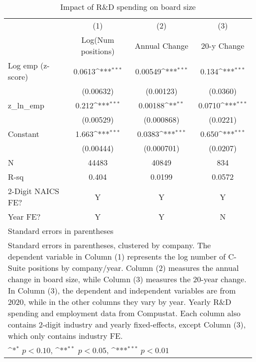 \begin{table}[htbp]\centering
\def\sym#1{\ifmmode^{#1}\else\(^{#1}\)\fi}
\caption{Impact of R\&D spending on board size\label{tab1}}
\begin{tabular}{l*{3}{c}}
\toprule
                &\multicolumn{1}{c}{(1)}&\multicolumn{1}{c}{(2)}&\multicolumn{1}{c}{(3)}\\
                &\multicolumn{1}{c}{Log(Num positions)}&\multicolumn{1}{c}{Annual Change}&\multicolumn{1}{c}{20-y Change}\\
\midrule
Log emp (z-score)&   0.0613\sym{***}&  0.00549\sym{***}&    0.134\sym{***}\\
                &(0.00632)         &(0.00123)         & (0.0360)         \\
z\_ln\_emp        &    0.212\sym{***}&  0.00188\sym{**} &   0.0710\sym{***}\\
                &(0.00529)         &(0.000868)         & (0.0221)         \\
Constant        &    1.663\sym{***}&   0.0383\sym{***}&    0.650\sym{***}\\
                &(0.00444)         &(0.000701)         & (0.0207)         \\
\midrule
N               &    44483         &    40849         &      834         \\
R-sq            &    0.404         &   0.0199         &   0.0572         \\
2-Digit NAICS FE?&        Y         &        Y         &        Y         \\
Year FE?        &        Y         &        Y         &        N         \\
\bottomrule
\multicolumn{4}{l}{\footnotesize Standard errors in parentheses}\\
\multicolumn{4}{l}{\footnotesize Standard errors in parentheses, clustered by company. The dependent variable in Column (1) represents the log number of C-Suite positions by company/year. Column (2) measures the annual change in board size, while Column (3) measures the 20-year change. In Column (3), the dependent and independent variables are from 2020, while in the other columns they vary by year. Yearly R\&D spending and employment data from Compustat. Each column also contains 2-digit industry and yearly fixed-effects, except Column (3), which only contains industry FE.}\\
\multicolumn{4}{l}{\footnotesize \sym{*} \(p<0.10\), \sym{**} \(p<0.05\), \sym{***} \(p<0.01\)}\\
\end{tabular}
\end{table}
